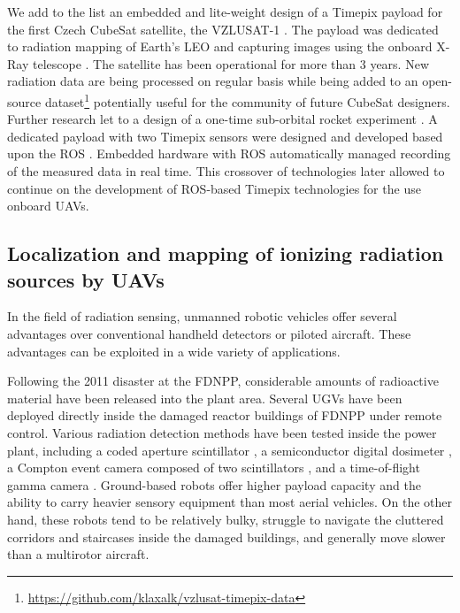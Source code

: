 \documentclass[a4paper,11pt,titlepage,twoside]{book}
\begin{document}

We add to the list an embedded and lite-weight design of a Timepix payload for the first Czech CubeSat satellite, the VZLUSAT-1 \cite{urban2017vzlusat, daniel2019inorbit}.
The payload was dedicated to radiation mapping of Earth's \ac{LEO} \cite{baca2018timepix} and capturing images using the onboard X-Ray telescope \cite{baca2016miniaturized}.
The satellite has been operational for more than 3 years.
New radiation data are being processed on regular basis while being added to an open-source dataset\footnote{\url{https://github.com/klaxalk/vzlusat-timepix-data}} potentially useful for the community of future CubeSat designers.
Further research let to a design of a one-time sub-orbital rocket experiment \cite{daniel2017xray, urban2020rex}.
A dedicated payload with two Timepix sensors were designed and developed based upon the \acl{ROS} \cite{baca2018rospix}.
Embedded hardware with \ac{ROS} automatically managed recording of the measured data in real time.
This crossover of technologies later allowed to continue on the development of \ac{ROS}-based Timepix technologies for the use onboard \aclp{UAV}.



\subsection{Localization and mapping of ionizing radiation sources by \acp{UAV}}

In the field of radiation sensing, unmanned robotic vehicles offer several advantages over conventional handheld detectors or piloted aircraft.
These advantages can be exploited in a wide variety of applications.

Following the 2011 disaster at the \ac{FDNPP}, considerable amounts of radioactive material have been released into the plant area.
Several \acp{UGV} have been deployed directly inside the damaged reactor buildings of \ac{FDNPP} under remote control.
Various radiation detection methods have been tested inside the power plant, including a coded aperture scintillator \cite{ohno2011robotic}, a semiconductor digital dosimeter \cite{nagatani2013emergency}, a Compton event camera composed of two scintillators \cite{sato2019radiation}, and a time-of-flight gamma camera \cite{kinoshita2014development}.
Ground-based robots offer higher payload capacity and the ability to carry heavier sensory equipment than most aerial vehicles.
On the other hand, these robots tend to be relatively bulky, struggle to navigate the cluttered corridors and staircases inside the damaged buildings, and generally move slower than a multirotor aircraft.
\end{document}
